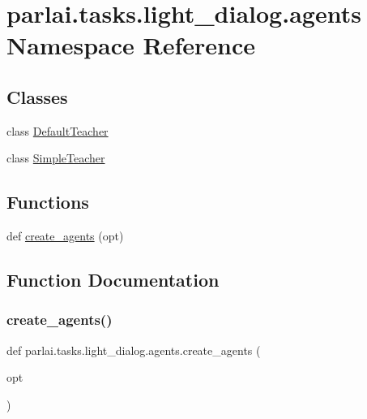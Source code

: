 \hypertarget{namespaceparlai_1_1tasks_1_1light__dialog_1_1agents}{}\section{parlai.\+tasks.\+light\+\_\+dialog.\+agents Namespace Reference}
\label{namespaceparlai_1_1tasks_1_1light__dialog_1_1agents}
\subsection*{Classes}
\begin{DoxyCompactItemize}
\item 
class \hyperlink{classparlai_1_1tasks_1_1light__dialog_1_1agents_1_1DefaultTeacher}{Default\+Teacher}
\item 
class \hyperlink{classparlai_1_1tasks_1_1light__dialog_1_1agents_1_1SimpleTeacher}{Simple\+Teacher}
\end{DoxyCompactItemize}
\subsection*{Functions}
\begin{DoxyCompactItemize}
\item 
def \hyperlink{namespaceparlai_1_1tasks_1_1light__dialog_1_1agents_a385701c6e26594b0ada35693cdf17b1c}{create\+\_\+agents} (opt)
\end{DoxyCompactItemize}


\subsection{Function Documentation}
\mbox{\label{namespaceparlai_1_1tasks_1_1light__dialog_1_1agents_a385701c6e26594b0ada35693cdf17b1c}} 
\subsubsection{\texorpdfstring{create\+\_\+agents()}{create\_agents()}}
{\footnotesize\ttfamily def parlai.\+tasks.\+light\+\_\+dialog.\+agents.\+create\+\_\+agents (\begin{DoxyParamCaption}\item[{}]{opt }\end{DoxyParamCaption})}



